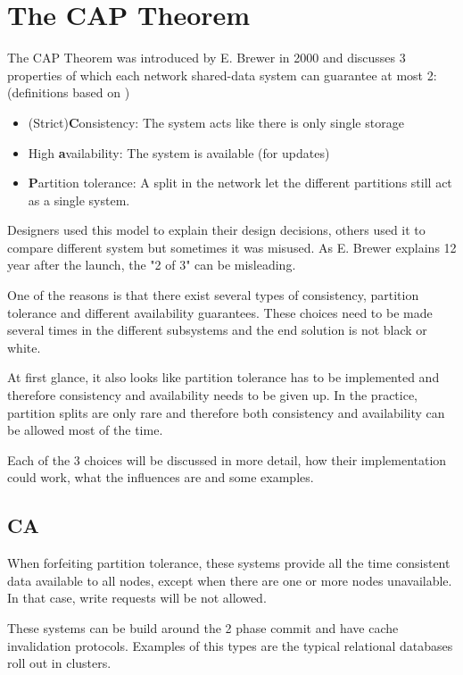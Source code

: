 \documentclass[final,5p,times]{elsarticle}
\begin{document}
\section{The CAP Theorem\cite{brewer2000towards}\cite{brewer2012cap}}
The CAP Theorem was introduced by E. Brewer \cite{brewer2000towards}  in 2000 and discusses 3 properties of which each network shared-data system can guarantee at most 2: (definitions based on \cite{brewer2012cap})
\begin{itemize}
\item (Strict)\textbf{C}onsistency: The system acts like there is only single storage 
\item High \textbf{a}vailability: The system is available (for updates)
\item \textbf{P}artition tolerance: A split in the network let the different partitions still act as a single system. 
\end{itemize}
Designers used this model to explain their design decisions, others used it to compare different system but sometimes it was misused. As E. Brewer explains 12 year after the launch, the "2 of 3" can be misleading.

One of the reasons is that there exist several types of consistency, partition tolerance and different availability guarantees. These choices need to be made several times in the different subsystems and the end solution is not black or white. 

At first glance, it also looks like partition tolerance has to be implemented and therefore consistency and availability needs to be given up. In the practice, partition splits are only rare and therefore both consistency and availability can be allowed most of the time. 

Each of the 3 choices will be discussed in more detail, how their implementation could work, what the influences are and some examples. 

\subsection{CA}
When forfeiting partition tolerance, these systems provide all the time consistent data available to all nodes, except when there are one or more nodes unavailable. In that case, write requests will be not allowed. 

These systems can be build around the 2 phase commit and have cache invalidation protocols. Examples of this types are the typical relational databases roll out in clusters. 
\end{document}
